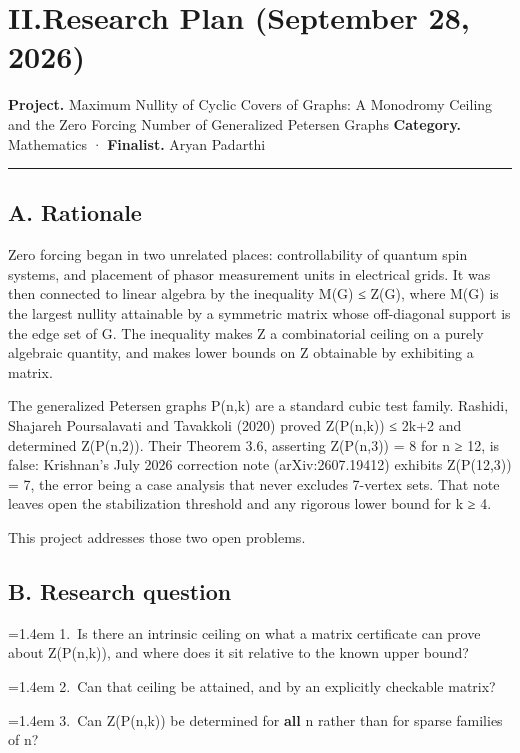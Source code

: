 \documentclass[11pt]{article}
\begin{document}
\newpage
\hypertarget{sec:plan}{\section*{II.\quad Research Plan \hfill\normalsize\normalfont(September 28, 2026)}}

\textbf{Project.} Maximum Nullity of Cyclic Covers of Graphs: A Monodromy Ceiling and
the Zero Forcing Number of Generalized Petersen Graphs
\textbf{Category.} Mathematics · \textbf{Finalist.} Aryan Padarthi

\vspace{0.5em}\hrule\vspace{0.7em}

\subsection*{A. Rationale}

Zero forcing began in two unrelated places: controllability of quantum spin
systems, and placement of phasor measurement units in electrical grids. It was
then connected to linear algebra by the inequality M(G) ≤ Z(G), where M(G) is
the largest nullity attainable by a symmetric matrix whose off-diagonal support
is the edge set of G. The inequality makes Z a combinatorial ceiling on a purely
algebraic quantity, and makes lower bounds on Z obtainable by exhibiting a
matrix.

The generalized Petersen graphs P(n,k) are a standard cubic test family. Rashidi,
Shajareh Poursalavati and Tavakkoli (2020) proved Z(P(n,k)) ≤ 2k+2 and determined
Z(P(n,2)). Their Theorem 3.6, asserting Z(P(n,3)) = 8 for n ≥ 12, is false:
Krishnan's July 2026 correction note (arXiv:2607.19412) exhibits Z(P(12,3)) = 7,
the error being a case analysis that never excludes 7-vertex sets. That note
leaves open the stabilization threshold and any rigorous lower bound for k ≥ 4.

This project addresses those two open problems.

\subsection*{B. Research question}

\par\hangindent=1.4em 1.~Is there an intrinsic ceiling on what a matrix certificate can prove about
   Z(P(n,k)), and where does it sit relative to the known upper bound?
\par\hangindent=1.4em 2.~Can that ceiling be attained, and by an explicitly checkable matrix?
\par\hangindent=1.4em 3.~Can Z(P(n,k)) be determined for \textbf{all} n rather than for sparse families of n?
\end{document}
